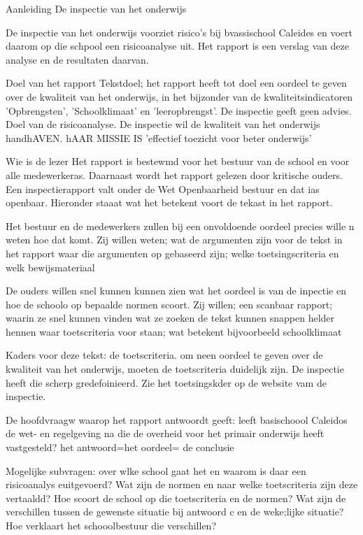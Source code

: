 			
			Aanleiding
			De inspectie van het onderwijs
			
			De inspectie van het onderwijs voorziet risico's bij bvassischool Caleides en voert daarom op die schpool een risicoanalyse uit. Het rapport is een verslag van deze analyse en de resultaten daarvan.
			
			Doel van het rapport
			Tekstdoel; het rapport heeft tot doel een oordeel te geven over de kwaliteit van het onderwijs, in het bijzonder van de kwaliteitsindicatoren 'Opbrengsten', 'Schoolklimaat' en 'leeropbrengst'. De inspectie geeft geen advies.
			Doel van de risicoanalyse. De inspectie wil de kwaliteit  van het onderwijs handhAVEN. hAAR MISSIE IS 'effectief toezicht  voor beter onderwijs'
			
			
			Wie is de lezer
			Het rapport is bestewmd voor het bestuur van de school en voor alle medewerkeras. Daarnaast wordt het rapport gelezen door kritische ouders. Een inspectierapport valt onder de Wet Openbaarheid bestuur en dat ias openbaar. Hieronder staaat wat het betekent voort de tekast in het rapport.
			
			Het bestuur en de medewerkers zullen bij een onvoldoende oordeel precies wille n weten hoe dat komt. Zij willen weten;
			wat de  argumenten zijn voor de tekst in het rapport
			waar die argumenten op gebaseerd zijn; welke toetsingscriteria en welk bewijsmateriaal
			
			
			De ouders willen snel kunnen kunnen zien wat het oordeel is van de inpectie en hoe de schoolo op bepaalde normen scoort. Zij willen;
			een scanbaar rapport; waarin ze snel kunnen vinden wat ze zoeken
			de tekst kunnen snappen
			helder hennen waar toetscriteria voor staan; wat betekent bijvoorbeeld schoolklimaat
			
			
			Kaders voor deze tekst: de toetscriteria. om neen oordeel te geven over de kwaliteit van het onderwijs, moeten de toetscriteria duidelijk zijn. De inspectie heeft die scherp gredefoinieerd. Zie het toetsingskder op de website vam de inspectie.
			
			De hoofdvraagw waarop het rapport antwoordt geeft: leeft basischoool Caleidos de wet- en regelgeving na die de overheid voor het primair onderwijs heeft vastgesteld? het antwoord=het oordeel= de conclusie
			
			
			Mogelijke subvragen:
			over wlke school gaat het en waarom is daar een risicoanalys euitgevoerd?
			Wat zijn de normen en naar welke toetscriteria zijn deze vertaaldd?
			Hoe scoort de school op die toetscriteria en de normen?
			Wat zijn de verschillen tussen de gewenste situatie bij antwoord c en de weke;lijke situatie?
			Hoe  verklaart het schooolbestuur die verschillen?
			
